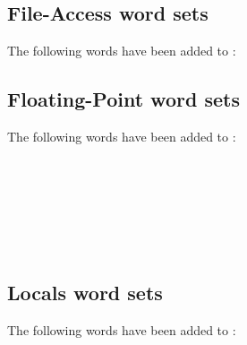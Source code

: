 \subsection{File-Access word sets}
The following words have been added to :

\begin{minipage}[t]{0.3\linewidth}
\end{minipage}
\hfill
\begin{minipage}[t]{0.3\linewidth}
\end{minipage}
\hfill
\begin{minipage}[t]{0.3\linewidth}
\end{minipage}

\subsection{Floating-Point word sets}
The following words have been added to :

\begin{minipage}[t]{0.3\linewidth}
	 \\
	 \\
\end{minipage}
\hfill
\begin{minipage}[t]{0.3\linewidth}
	 \\
\end{minipage}
\hfill
\begin{minipage}[t]{0.3\linewidth}
	 \\
\end{minipage}

\subsection{Locals word sets}
The following words have been added to :


\subsection[Memory-Allocation word sets]{}

